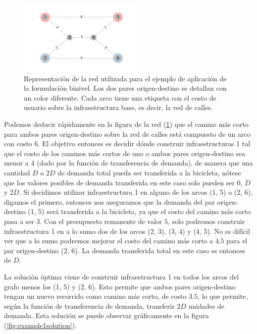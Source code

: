 \documentclass{article}
\begin{document}
  \begin{figure}[h!]
    \centering
    \includegraphics[width=6cm]{../resources/example_1_base.png}
    \caption{Representación de la red utilizada para el ejemplo de aplicación de la formulación binivel. Los dos pares origen-destino se detallan con un color diferente. Cada arco tiene una etiqueta con el costo de usuario sobre la infraestructura base, es decir, la red de calles.}
    \label{fig:example1base}
  \end{figure}

  Podemos deducir rápidamente en la figura de la red (\ref{fig:example1base}) que el camino más corto para ambos pares origen-destino sobre la red de calles está compuesto de un arco con costo 6. El objetivo entonces es decidir dónde construir infraestructuras 1 tal que el costo de los caminos más cortos de uno o ambos pares origen-destino sea menor a 4 (dado por la función de transferencia de demanda), de manera que una cantidad $D$ o $2D$ de demanda total pueda ser transferida a la bicicleta, nótese que los valores posibles de demanda transferida en este caso solo pueden ser $0$, $D$ y $2D$. Si decidimos utilizar infraestructura 1 en alguno de los arcos (1, 5) o (2, 6), digamos el primero, entonces nos aseguramos que la demanda del par origen-destino (1, 5) será transferida a la bicicleta, ya que el costo del camino más corto pasa a ser $3$. Con el presupuesto remanente de valor $5$, solo podremos construir infraestructura 1 en a lo sumo dos de los arcos (2, 3), (3, 4) y (4, 5). No es difícil ver que a lo sumo podremos mejorar el costo del camino más corto a $4.5$ para el par origen-destino (2, 6). La demanda transferida total en este caso es entonces de $D$.

  La solución óptima viene de construir infraestructura 1 en todos los arcos del grafo menos los (1, 5) y (2, 6). Esto permite que ambos pares origen-destino tengan un nuevo recorrido como camino más corto, de costo $3.5$, lo que permite, según la función de transferencia de demanda, transferir $2D$ unidades de demanda. Esta solución se puede observar gráficamente en la figura (\ref{fig:example1solution}).
\end{document}
